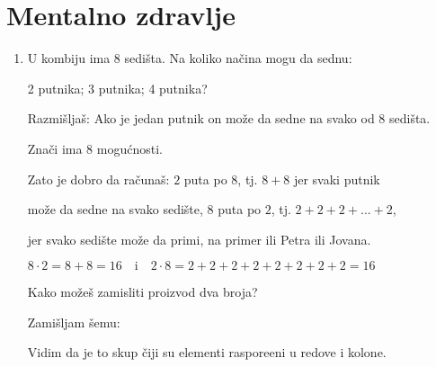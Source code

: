     \section{Mentalno zdravlje}

    \begin{zad}

        \begin{enumerate}

            \item U kombiju ima 8 sedi\v sta. Na koliko na\v cina mogu da sednu:

            2 putnika; 3 putnika; 4 putnika?

            

            Razmi\v slja\v s: Ako je jedan putnik on mo\v ze da sedne na svako od 8 sedi\v sta.

            Zna\v ci ima 8 mogu\' cnosti.



            Zato je dobro da ra\v cuna\v s: $2$ puta po $8$, tj. $8 + 8$ jer svaki putnik

            mo\v ze da sedne na svako sedi\v ste, $8$ puta po $2$, tj. $2+2+2+...+2$,

            jer svako sedi\v ste mo\v ze da primi, na primer ili Petra ili Jovana.

            $8 \cdot 2 = 8 + 8 = 16 \quad \text{i} \quad 2\cdot 8 = 2+2+2+2+2+2+2+2 = 16$

            Kako mo\v ze\v s zamisliti proizvod dva broja?



            Zami\v sljam \v semu:

            \begin{figure}

            \centering



            \end{figure}



            Vidim da je to skup \v ciji su elementi raspore\dj eni u redove i kolone.

            \begin{figure}[h]

                \centering


            \end{figure}


\end{enumerate}
\end{zad}
